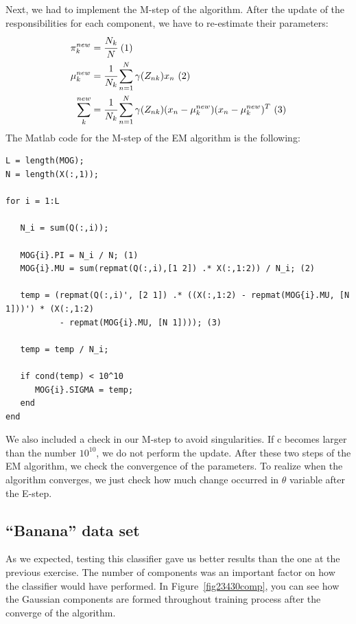 \documentclass[a4paper,11pt]{article}
\begin{document}
Next, we had to implement the M-step of the algorithm. After the update of the responsibilities for each component, we have to re-estimate their parameters:
\begin{align*}
\pi_k^{new} &= \cfrac{N_k}{N}\	(1)\\
\mu_k^{new} &= \cfrac{1}{N_k} \sum_{n=1}^N \gamma(Z_{nk}) x_n\	(2)\\
\sum_k^{new} &= \cfrac{1}{N_k} \sum_{n=1}^N \gamma(Z_{nk}) (x_n - \mu_k^{new}) (x_n - \mu_k^{new})^T\	(3)
\end{align*}
The Matlab code for the M-step of the EM algorithm is the following:
\begin{verbatim}
L = length(MOG);
N = length(X(:,1));
    
for i = 1:L
        
   N_i = sum(Q(:,i));
   
   MOG{i}.PI = N_i / N; (1)
   MOG{i}.MU = sum(repmat(Q(:,i),[1 2]) .* X(:,1:2)) / N_i; (2)

   temp = (repmat(Q(:,i)', [2 1]) .* ((X(:,1:2) - repmat(MOG{i}.MU, [N 1]))') * (X(:,1:2)
           - repmat(MOG{i}.MU, [N 1]))); (3)
   
   temp = temp / N_i;
        
   if cond(temp) < 10^10
      MOG{i}.SIGMA = temp;
   end
end
\end{verbatim}
We also included a check in our M-step to avoid singularities. If c becomes larger than the number $10^{10}$, we do not perform the update. After these two steps of the EM algorithm, we check the convergence of the parameters. To realize when the algorithm converges, we just check how much change occurred in $\theta$ variable after the E-step.

\subsection*{``Banana'' data set}
As we expected, testing this classifier gave us better results than the one at the previous exercise. The number of components was an important factor on how the classifier would have performed. In Figure~\ref{fig23430comp}, you can see how the Gaussian components are formed throughout training process after the converge of the algorithm. 
\end{document}
